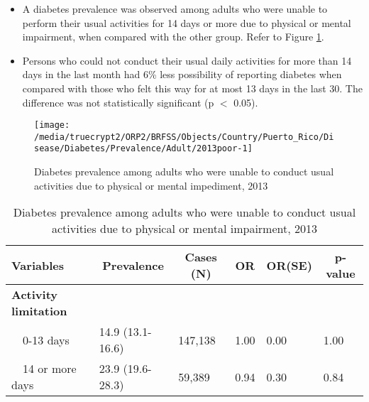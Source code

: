  \newpage
\begin{itemize}

\item A  
diabetes prevalence was observed among adults who were unable to perform their usual activities for 14 days or more due to physical or mental impairment, when compared with the other group. Refer to Figure \ref{fig:poor.Diabetes.2013}.



\item Persons who could not conduct their usual daily activities for more than 14 days in the last month had 6\% less possibility of reporting diabetes when compared with those who felt this way for at most 13 days in the last 30. The difference was not statistically significant (p $<$ 0.05).

\end{itemize}

\begin{figure}[H]
\caption{Diabetes prevalence among adults who were unable to conduct usual activities due to physical or mental impediment, 2013}
\label{fig:poor.Diabetes.2013}

\begin{knitrout}
\color{fgcolor}

{\centering \texttt{[image: /media/truecrypt2/ORP2/BRFSS/Objects/Country/Puerto\_Rico/Disease/Diabetes/Prevalence/Adult/2013poor-1]} 

}


\end{knitrout}
\end{figure}

\begin{table}[H]
\caption{Diabetes prevalence among adults who were unable to conduct usual activities due to physical or mental impairment, 2013\label{tab:poor.Diabetes.2013}} 
\begin{center}
\begin{tabular}{llllll}
\hline\hline
\multicolumn{1}{l}{Variables}&\multicolumn{1}{c}{Prevalence}&\multicolumn{1}{c}{Cases (N)}&\multicolumn{1}{c}{OR}&\multicolumn{1}{c}{OR(SE)}&\multicolumn{1}{c}{p-value}\tabularnewline
\hline
{\bfseries Activity limitation}&&&&&\tabularnewline
~~0-13 days&14.9 (13.1-16.6)&147,138&1.00&0.00&1.00\tabularnewline
~~14 or more days&23.9 (19.6-28.3)& 59,389&0.94&0.30&0.84\tabularnewline
\hline
\end{tabular}\end{center}

\end{table}


